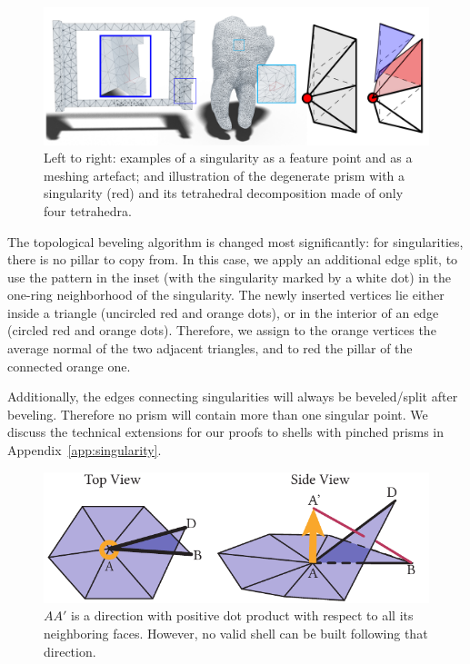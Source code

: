 \begin{figure}
\centering
\includegraphics[width=\linewidth]{prism-tex/figs/degenerate_prism_decompose}
\caption{Left to right: examples of a singularity as a feature point and as a meshing artefact; and illustration of the degenerate prism with a singularity (red) and its tetrahedral decomposition made of only four tetrahedra.}
\label{prism:fig:singularity-illustration}

\end{figure}

The topological beveling algorithm is changed most significantly: for singularities, there is no pillar to copy from.
In this case, we apply an additional edge split, to use the pattern in the inset (with the singularity marked by a white dot) in the one-ring neighborhood of the singularity.
The newly inserted vertices lie either inside a triangle (uncircled red and orange dots), 
or in the interior of an edge (circled red and orange dots).
Therefore, we assign to the orange vertices the average normal of the two adjacent triangles, and to red the pillar of the connected orange one.


Additionally, the edges connecting singularities will always be beveled/split after beveling. Therefore no prism will contain more than one singular point.
We discuss the technical extensions for our proofs to shells with pinched prisms in Appendix~\ref{app:singularity}.


\begin{figure}
    \centering
    \includegraphics[width=0.9\linewidth]{prism-tex/figs/boundary_singular}
    \caption{$AA'$ is a direction with positive dot product with respect to all its neighboring faces. However, no valid shell can be built following that direction.}
    \label{prism:fig:boundary_singularity}
    
\end{figure}

